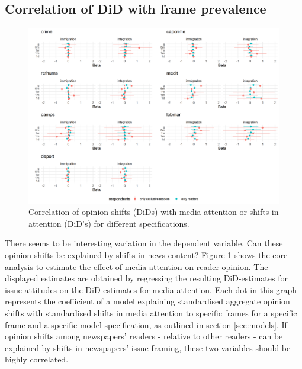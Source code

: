 \documentclass{article}
\begin{document}
\subsection{Correlation of DiD with frame prevalence}
\begin{figure}[!ht]
    \centering
    \includegraphics[width=\textwidth]{paper/vis/effectplot_frames.png}
    \caption{Correlation of opinion shifts (DiDs) with media attention or shifts in attention (DiD's) for different specifications.}
    \label{fig:did_corr}
\end{figure}

There seems to be interesting variation in the dependent variable. Can these opinion shifts be explained by shifts in news content? Figure \ref{fig:did_corr} shows the core analysis to estimate the effect of media attention on reader opinion. The displayed estimates are obtained by regressing the resulting DiD-estimates for issue attitudes on the DiD-estimates for media attention. Each dot in this graph represents the coefficient of a model explaining standardised aggregate opinion shifts with standardised shifts in media attention to specific frames for a specific frame and a specific model specification, as outlined in section \ref{sec:models}. If opinion shifts among newspapers' readers - relative to other readers - can be explained by shifts in newspapers' issue framing, these two variables should be highly correlated.
\end{document}
